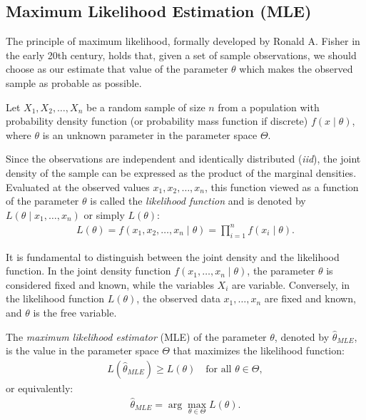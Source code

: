 \subsection{Maximum Likelihood Estimation (MLE)}

The principle of maximum likelihood, formally developed by Ronald A. Fisher in the early 20th century, holds that, given a set of sample observations, we should choose as our estimate that value of the parameter $\theta$ which makes the observed sample as probable as possible.

\begin{definicion}
	Let $X_1, X_2, \ldots, X_n$ be a random sample of size $n$ from a population with probability density function (or probability mass function if discrete) $f(x \mid \theta)$, where $\theta$ is an unknown parameter in the parameter space $\Theta$.

	Since the observations are independent and identically distributed (\emph{iid}), the joint density of the sample can be expressed as the product of the marginal densities. Evaluated at the observed values $x_1, x_2, \ldots, x_n$, this function viewed as a function of the parameter $\theta$ is called the \emph{likelihood function} and is denoted by $L(\theta \mid x_1, \ldots, x_n)$ or simply $L(\theta)$:
	\begin{align}
		L(\theta) = f(x_1, x_2, \ldots, x_n \mid \theta) = \prod_{i=1}^n f(x_i \mid \theta).
		\label{eq:verosimilitud_def}
	\end{align}
\end{definicion}

\begin{observacion}
	It is fundamental to distinguish between the joint density and the likelihood function. In the joint density function $f(x_1, \ldots, x_n \mid \theta)$, the parameter $\theta$ is considered fixed and known, while the variables $X_i$ are variable. Conversely, in the likelihood function $L(\theta)$, the observed data $x_1, \ldots, x_n$ are fixed and known, and $\theta$ is the free variable.
\end{observacion}

\begin{definicion}
	The \emph{maximum likelihood estimator} (MLE) of the parameter $\theta$, denoted by $\hat{\theta}_{MLE}$, is the value in the parameter space $\Theta$ that maximizes the likelihood function:
	\begin{align}
		L(\hat{\theta}_{MLE}) \geq L(\theta) \quad \text{for all } \theta \in \Theta,
	\end{align}
	or equivalently:
	\begin{align}
		\hat{\theta}_{MLE} = \arg\max_{\theta \in \Theta} L(\theta).
	\end{align}
\end{definicion}

